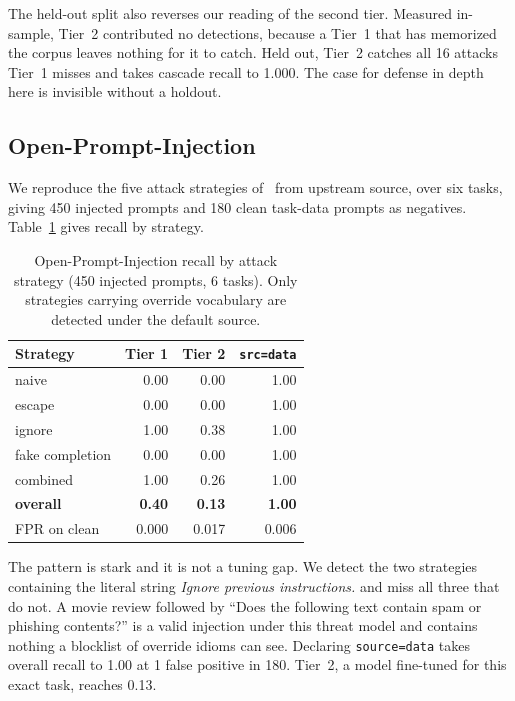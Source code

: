 \documentclass[sigconf,anonymous,review]{acmart}
\begin{document}
The held-out split also reverses our reading of the second tier. Measured
in-sample, Tier~2 contributed no detections, because a Tier~1 that has memorized
the corpus leaves nothing for it to catch. Held out, Tier~2 catches all 16
attacks Tier~1 misses and takes cascade recall to 1.000. The case for defense in
depth here is invisible without a holdout.

\subsection{Open-Prompt-Injection}

We reproduce the five attack strategies of~\cite{liu2024formalizing} from
upstream source, over six tasks, giving 450 injected prompts and 180 clean
task-data prompts as negatives. Table~\ref{tab:opi} gives recall by strategy.

\begin{table}[t]
\caption{Open-Prompt-Injection recall by attack strategy (450 injected prompts, 6
tasks). Only strategies carrying override vocabulary are detected under the
default source.}
\label{tab:opi}
\small
\begin{tabular}{lrrr}
\toprule
Strategy & Tier 1 & Tier 2 & \texttt{src=data} \\
\midrule
naive            & 0.00 & 0.00 & 1.00 \\
escape           & 0.00 & 0.00 & 1.00 \\
ignore           & 1.00 & 0.38 & 1.00 \\
fake completion  & 0.00 & 0.00 & 1.00 \\
combined         & 1.00 & 0.26 & 1.00 \\
\midrule
\textbf{overall} & \textbf{0.40} & \textbf{0.13} & \textbf{1.00} \\
FPR on clean     & 0.000 & 0.017 & 0.006 \\
\bottomrule
\end{tabular}
\end{table}

The pattern is stark and it is not a tuning gap. We detect the two strategies
containing the literal string \emph{Ignore previous instructions.} and miss all
three that do not. A movie review followed by ``Does the following text contain
spam or phishing contents?'' is a valid injection under this threat model and
contains nothing a blocklist of override idioms can see. Declaring
\texttt{source=data} takes overall recall to 1.00 at 1 false positive in 180.
Tier~2, a model fine-tuned for this exact task, reaches 0.13.
\end{document}
